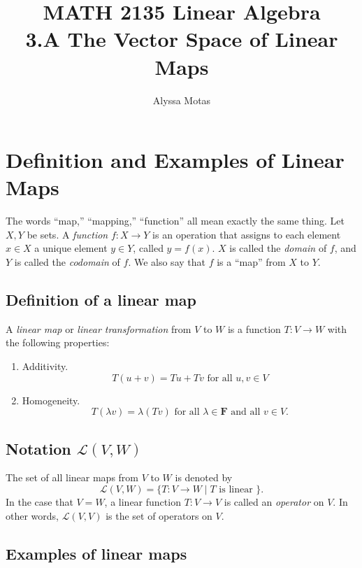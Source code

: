 \documentclass[11pt]{article}
\title{\textbf{MATH 2135 Linear Algebra} \\ 3.A The Vector Space of Linear Maps}
\author{Alyssa Motas}
\begin{document}
    \maketitle

    \pagebreak

    \tableofcontents

    \pagebreak

    \section{Definition and Examples of Linear Maps}

    The words ``map,'' ``mapping,'' ``function'' all mean exactly the same thing. Let $X,Y$ be sets. A \emph{function} \(f:X \rightarrow Y\) is an operation that assigns to each element \(x \in X\) a unique element \(y \in Y\), called \(y = f(x)\). $X$ is called the \emph{domain} of $f$, and $Y$ is called the \emph{codomain} of $f$. We also say that $f$ is a ``map'' from $X$ to $Y$.

    \subsection{Definition of a linear map}

    A \emph{linear map} or \emph{linear transformation} from $V$ to $W$ is a function \(T:V \rightarrow W\) with the following properties:
    \begin{enumerate}
        \item Additivity. \[T(u+v) = Tu + Tv \text{ for all } u,v \in V\]
        \item Homogeneity. \[T(\lambda v) = \lambda (Tv) \text{ for all } \lambda \in \textbf{F} \text{ and all } v \in V.\]
    \end{enumerate}

    \subsection{Notation \(\mathcal{L}(V,W)\)}

    The set of all linear maps from $V$ to $W$ is denoted by \[\mathcal{L}(V,W) = \{T:V \rightarrow W \mid T \text{ is linear }\}.\] In the case that \(V=W\), a linear function \(T:V \rightarrow V\) is called an \emph{operator} on $V$. In other words, \(\mathcal{L}(V,V)\) is the set of operators on $V$.

    \subsection{Examples of linear maps}
\end{document}
